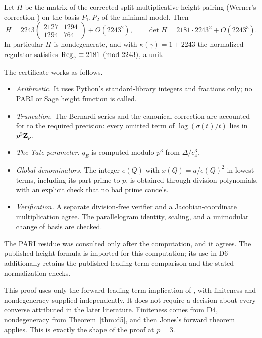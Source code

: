\begin{theorem}\label{thm:d5}
Let $H$ be the matrix of the corrected split-multiplicative height pairing \cite[\S4.2]{sw} (Werner's correction \cite{werner}) on the basis $P_1,P_2$ of the minimal model. Then
\[
H=2243\begin{pmatrix}2127&1294\\1294&764\end{pmatrix}+O(2243^2),\qquad\det H=2181\cdot2243^2+O(2243^3).
\]
In particular $H$ is nondegenerate, and with $\kappa(\gamma)=1+2243$ the normalized regulator satisfies $\operatorname{Reg}_\gamma\equiv2181\pmod{2243}$, a unit.
\end{theorem}
The certificate works as follows.
\begin{itemize}[leftmargin=*]
\item \emph{Arithmetic.} It uses Python's standard-library integers and fractions only; no PARI or Sage height function is called.
\item \emph{Truncation.} The Bernardi series and the canonical correction are accounted for to the required precision: every omitted term of $\log(\sigma(t)/t)$ lies in $p^2\mathbf{Z}_p$.
\item \emph{The Tate parameter.} $q_E$ is computed modulo $p^3$ from $\Delta/c_4^3$.
\item \emph{Global denominators.} The integer $e(Q)$ with $x(Q)=a/e(Q)^2$ in lowest terms, including its part prime to $p$, is obtained through division polynomials, with an explicit check that no bad prime cancels.
\item \emph{Verification.} A separate division-free verifier and a Jacobian-coordinate multiplication agree. The parallelogram identity, scaling, and a unimodular change of basis are checked.
\end{itemize}
The PARI residue was consulted only after the computation, and it agrees. The published height formula is imported for this computation; its use in D6 additionally retains the published leading-term comparison and the stated normalization checks.

\begin{remark}
This proof uses only the forward leading-term implication of \cite[Thm.~3.1]{jones}, with finiteness and nondegeneracy supplied independently. It does not require a decision about every converse attributed in the later literature. Finiteness comes from D4, nondegeneracy from Theorem~\ref{thm:d5}, and then Jones's forward theorem applies. This is exactly the shape of the proof at $p=3$.
\end{remark}


